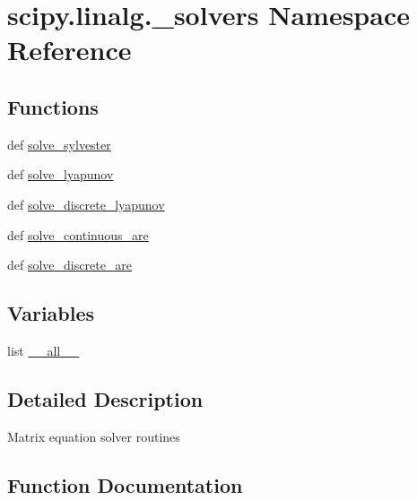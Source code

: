 \hypertarget{namespacescipy_1_1linalg_1_1__solvers}{}\section{scipy.\+linalg.\+\_\+solvers Namespace Reference}
\label{namespacescipy_1_1linalg_1_1__solvers}
\subsection*{Functions}
\begin{DoxyCompactItemize}
\item 
def \hyperlink{namespacescipy_1_1linalg_1_1__solvers_a9968270913d8aebdfe496cbc9b4e4909}{solve\+\_\+sylvester}
\item 
def \hyperlink{namespacescipy_1_1linalg_1_1__solvers_af2510713e1ae7d53c8b26193ff98e929}{solve\+\_\+lyapunov}
\item 
def \hyperlink{namespacescipy_1_1linalg_1_1__solvers_ae6a7f34e2f73311a2b3a995bd0119314}{solve\+\_\+discrete\+\_\+lyapunov}
\item 
def \hyperlink{namespacescipy_1_1linalg_1_1__solvers_a767e8143ba71f2239029bc6ae424c1d6}{solve\+\_\+continuous\+\_\+are}
\item 
def \hyperlink{namespacescipy_1_1linalg_1_1__solvers_a59716674940b0641724d2df8caa5680d}{solve\+\_\+discrete\+\_\+are}
\end{DoxyCompactItemize}
\subsection*{Variables}
\begin{DoxyCompactItemize}
\item 
list \hyperlink{namespacescipy_1_1linalg_1_1__solvers_ae47545360ff6e70df51361aee24589d3}{\+\_\+\+\_\+all\+\_\+\+\_\+}
\end{DoxyCompactItemize}


\subsection{Detailed Description}
\begin{DoxyVerb}Matrix equation solver routines\end{DoxyVerb}
 

\subsection{Function Documentation}
\hypertarget{namespacescipy_1_1linalg_1_1__solvers_a767e8143ba71f2239029bc6ae424c1d6}{}
